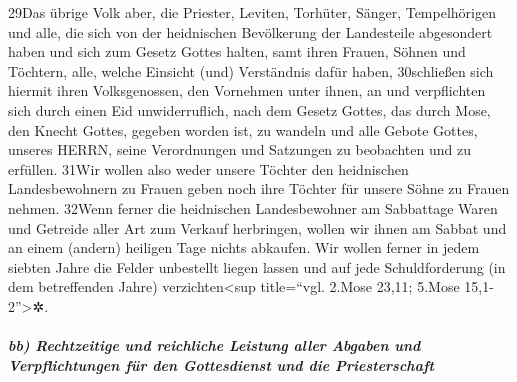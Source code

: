 29Das übrige Volk aber, die Priester, Leviten, Torhüter, Sänger,
Tempelhörigen und alle, die sich von der heidnischen Bevölkerung der
Landesteile abgesondert haben und sich zum Gesetz Gottes halten, samt
ihren Frauen, Söhnen und Töchtern, alle, welche Einsicht (und)
Verständnis dafür haben, 30schließen sich hiermit ihren Volksgenossen,
den Vornehmen unter ihnen, an und verpflichten sich durch einen Eid
unwiderruflich, nach dem Gesetz Gottes, das durch Mose, den Knecht
Gottes, gegeben worden ist, zu wandeln und alle Gebote Gottes, unseres
HERRN, seine Verordnungen und Satzungen zu beobachten und zu erfüllen.
31Wir wollen also weder unsere Töchter den heidnischen Landesbewohnern
zu Frauen geben noch ihre Töchter für unsere Söhne zu Frauen nehmen.
32Wenn ferner die heidnischen Landesbewohner am Sabbattage Waren und
Getreide aller Art zum Verkauf herbringen, wollen wir ihnen am Sabbat
und an einem (andern) heiligen Tage nichts abkaufen. Wir wollen ferner
in jedem siebten Jahre die Felder unbestellt liegen lassen und auf jede
Schuldforderung (in dem betreffenden Jahre) verzichten\textless sup
title=``vgl. 2.Mose 23,11; 5.Mose 15,1-2''\textgreater✲.

\hypertarget{bb-rechtzeitige-und-reichliche-leistung-aller-abgaben-und-verpflichtungen-fuxfcr-den-gottesdienst-und-die-priesterschaft}{%
\subparagraph{bb) Rechtzeitige und reichliche Leistung aller Abgaben und
Verpflichtungen für den Gottesdienst und die
Priesterschaft}\label{bb-rechtzeitige-und-reichliche-leistung-aller-abgaben-und-verpflichtungen-fuxfcr-den-gottesdienst-und-die-priesterschaft}}

